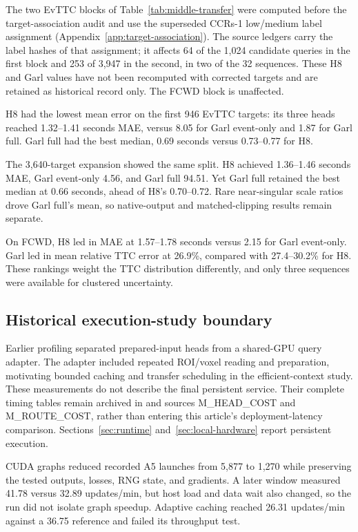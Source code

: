 The two EvTTC blocks of Table~\ref{tab:middle-transfer} were computed before the target-association audit and use the superseded CCRs-1 low/medium label assignment (Appendix~\ref{app:target-association}). The source ledgers carry the label hashes of that assignment; it affects 64 of the 1,024 candidate queries in the first block and 253 of 3,947 in the second, in two of the 32 sequences. These H8 and Garl values have not been recomputed with corrected targets and are retained as historical record only. The FCWD block is unaffected.

H8 had the lowest mean error on the first 946 EvTTC targets: its three heads reached 1.32--1.41 seconds MAE, versus 8.05 for Garl event-only and 1.87 for Garl full. Garl full had the best median, 0.69 seconds versus 0.73--0.77 for H8.

The 3,640-target expansion showed the same split. H8 achieved 1.36--1.46 seconds MAE, Garl event-only 4.56, and Garl full 94.51. Yet Garl full retained the best median at 0.66 seconds, ahead of H8's 0.70--0.72. Rare near-singular scale ratios drove Garl full's mean, so native-output and matched-clipping results remain separate.

On FCWD, H8 led in MAE at 1.57--1.78 seconds versus 2.15 for Garl event-only. Garl led in mean relative TTC error at 26.9\%, compared with 27.4--30.2\% for H8. These rankings weight the TTC distribution differently, and only three sequences were available for clustered uncertainty. 

\subsection{Historical execution-study boundary}

Earlier profiling separated prepared-input heads from a shared-GPU query adapter. The adapter included repeated ROI/voxel reading and preparation, motivating bounded caching and transfer scheduling in the efficient-context study. These measurements do not describe the final persistent service. Their complete timing tables remain archived in  and sources M\_HEAD\_COST and M\_ROUTE\_COST, rather than entering this article's deployment-latency comparison. Sections~\ref{sec:runtime} and~\ref{sec:local-hardware} report persistent execution.

CUDA graphs reduced recorded A5 launches from 5,877 to 1,270 while preserving the tested outputs, losses, RNG state, and gradients. A later window measured 41.78 versus 32.89 updates/min, but host load and data wait also changed, so the run did not isolate graph speedup. Adaptive caching reached 26.31 updates/min against a 36.75 reference and failed its throughput test. 

